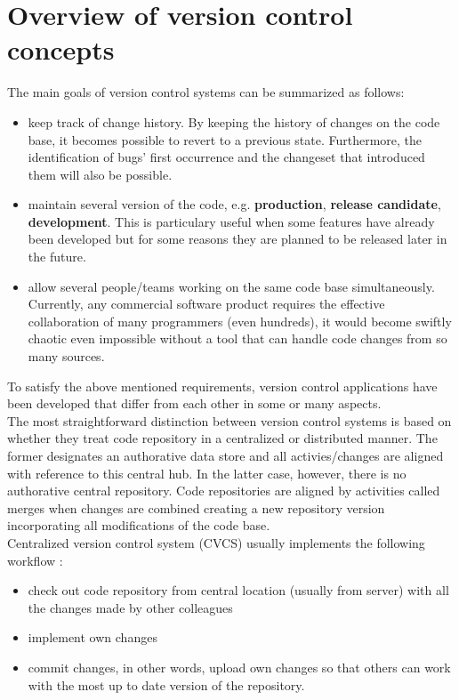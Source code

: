 \section{Overview of version control concepts} \label{overview-version-control}
The main goals of version control systems can be summarized as follows:
\begin{itemize}
    \item keep track of change history. By keeping the history of changes on the code base, it becomes possible to revert
    to a previous state. Furthermore, the identification of bugs' first occurrence and the changeset that introduced them
    will also be possible.
    \item maintain several version of the code, e.g. \textbf{production}, \textbf{release candidate}, \textbf{development}. 
    This is particulary useful when some features have already been developed but for some reasons they are planned to be 
    released later in the future.
    \item allow several people/teams working on the same code base simultaneously. Currently, any commercial software
    product requires the effective collaboration of many programmers (even hundreds), it would become swiftly chaotic
    even impossible without a tool that can handle code changes from so many sources.
\end{itemize}
To satisfy the above mentioned requirements, version control applications have been developed that differ from each other in
some or many aspects. \\
The most straightforward distinction between version control systems is based on whether they treat code repository in 
a centralized or distributed manner. The former designates an authorative data store and all activies/changes are 
aligned with reference to this central hub. In the latter case, however, there is no authorative central repository.
Code repositories are aligned by activities called merges when changes are combined creating a new repository version 
incorporating all modifications of the code base. \\
Centralized version control system (CVCS) usually implements the following workflow \cite{atlassian-vcs}:
\begin{itemize}
    \item check out code repository from central location (usually from server) with all the changes made by other
    colleagues
    \item implement own changes
    \item commit changes, in other words, upload own changes so that others can work with the most up to date version of
    the repository.
\end{itemize}

